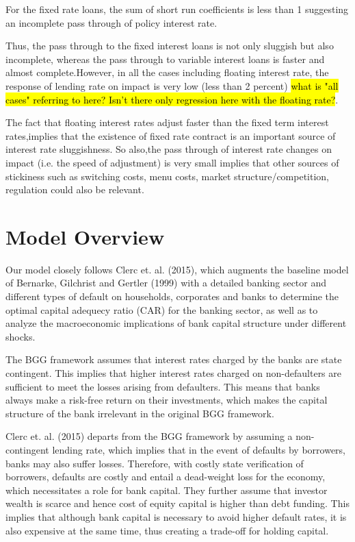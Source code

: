 \documentclass[12pt]{article}
\numberwithin{equation}{section}
\begin{document}
For the fixed rate loans, the sum of short run coefficients is less than 1 suggesting an incomplete pass through of policy interest rate.

Thus, the pass through to the fixed interest loans is not only sluggish but also incomplete, whereas the pass through to variable interest loans is faster and almost complete.However, in all the cases including floating interest rate, the response of lending rate on impact is very low (less than 2 percent) \hl{what is "all cases" referring to here? Isn't there only regression here with the floating rate?}.

The fact that  floating interest rates adjust faster than the fixed term interest rates,implies that the existence of fixed rate contract is an important source of interest rate sluggishness. So also,the pass through of interest rate changes on impact (i.e. the speed of adjustment) is very small implies that other sources of stickiness such as switching costs, menu costs, market structure/competition, regulation could also be relevant.




 
\section{Model Overview}
Our model closely follows Clerc et. al. (2015), which augments the baseline model of Bernarke, Gilchrist and Gertler (1999) with a detailed banking sector and different types of default on households, corporates and banks to determine the optimal capital adequecy ratio (CAR) for the banking sector, as well as to analyze the macroeconomic implications of bank capital structure under different shocks. 

The BGG framework assumes that interest rates charged by the banks are state contingent. This implies that higher interest rates charged on non-defaulters are sufficient to meet the losses arising from defaulters. This means that banks always make a risk-free return on their investments, which makes the capital structure of the bank irrelevant in the original BGG framework.

Clerc et. al. (2015) departs from the BGG framework by assuming a non-contingent lending rate, which implies that in the event of defaults by borrowers, banks may also suffer losses. Therefore, with costly state verification of borrowers, defaults are costly and entail a dead-weight loss for the economy, which necessitates a role for bank capital. They further assume that investor wealth is scarce and hence cost of equity capital is higher than debt funding. This implies that although bank capital is necessary to avoid higher default rates, it is also expensive at the same time, thus creating a trade-off for holding capital. 
\end{document}
